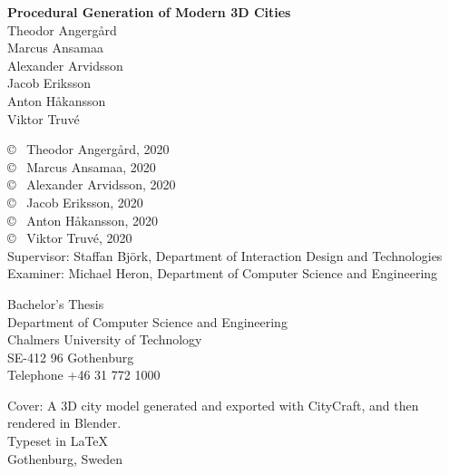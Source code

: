\newpage
\thispagestyle{empty}
\vspace*{4.5cm}
\textbf{Procedural Generation of Modern 3D Cities} \\
Theodor Angergård \\
Marcus Ansamaa \\
Alexander Arvidsson \\
Jacob Eriksson \\
Anton Håkansson \\
Viktor Truvé \\
\setlength{\parskip}{1cm}

\copyright ~ Theodor Angergård, 2020 \\
\copyright ~ Marcus Ansamaa, 2020 \\
\copyright ~ Alexander Arvidsson, 2020 \\
\copyright ~ Jacob Eriksson, 2020 \\
\copyright ~ Anton Håkansson, 2020 \\
\copyright ~ Viktor Truvé, 2020 \\

Supervisor: Staffan Björk, Department of Interaction Design and Technologies \\
Examiner: Michael Heron, Department of Computer Science and Engineering \setlength{\parskip}{1cm}

Bachelor's Thesis \the\year\\	%
Department of Computer Science and Engineering\\
Chalmers University of Technology\\
SE-412 96 Gothenburg\\
Telephone +46 31 772 1000 \setlength{\parskip}{0.5cm}

\vfill
Cover: A 3D city model generated and exported with CityCraft, and then rendered in Blender. \setlength{\parskip}{0.5cm} \\
Typeset in \LaTeX \\
Gothenburg, Sweden \the\year